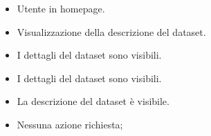     \UCdsc
    { %
        \begin{itemize}
            \item Utente in homepage.
        \end{itemize}
    }
    { %
        \begin{itemize}
            \item   Visualizzazione della descrizione del dataset.
        \end{itemize}
    }
    { %
        \begin{itemize}
            \item I dettagli del dataset sono visibili.
        \end{itemize}
    }
    { %
        \begin{itemize}
            \item I dettagli del dataset sono visibili.
            \item La descrizione del dataset è visibile.
        \end{itemize}
    }
    { %
        \begin{itemize}
            \item Nessuna azione richiesta;
        \end{itemize}
    }



